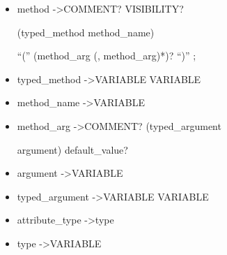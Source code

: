 \begin{itemize}
 \item method   -\textgreater   COMMENT?  VISIBILITY?  
 
 (typed{\_}method \textbar method{\_}name)  
 
 ``(''  (method{\_}arg  (,  method{\_}arg)*)?  ``)''  ;

 \item typed{\_}method   -\textgreater   VARIABLE  VARIABLE

 \item method{\_}name   -\textgreater   VARIABLE

 \item method{\_}arg   -\textgreater   COMMENT?  (typed{\_}argument 
 
 \textbar argument)  default{\_}value?

 \item argument   -\textgreater   VARIABLE

 \item typed{\_}argument   -\textgreater   VARIABLE  VARIABLE

 \item attribute{\_}type   -\textgreater   type

 \item type   -\textgreater   VARIABLE

 \end{itemize}